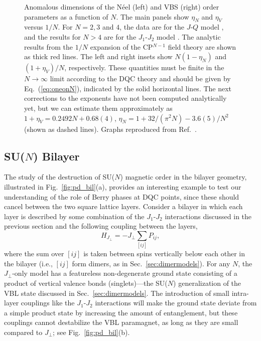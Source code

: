 \documentclass[range]{ar2e}
\begin{document}
\begin{figure}
\centerline{}
 \caption{ \label{fig:exp} Anomalous dimensions of the N\'eel (left) and VBS (right)
  order parameters as a function of $N$. The main panels show $\eta_N$ and $\eta_V$ versus $1/N$. For $N=2,3$ and $4$, the data are 
  for the $J$-$Q$ model \cite{lou2009:sun}, and the results for $N>4$ are for the $J_1$-$J_2$ model \cite{kaul2011:j1j2}. The analytic 
  results from the $1/N$ expansion of the CP$^{N-1}$ field theory are shown as thick red lines. The left and right insets 
  show $N(1-\eta_N)$ and $(1+\eta_V)/N$, respectively. These quantities must be finite in the  $N\rightarrow \infty$ 
  limit according to the DQC theory and should be given by Eq.~(\ref{eq:oneonN}), indicated by the solid horizontal lines. 
  The next corrections to the exponents have not been computed analytically yet, but we can estimate them approximately 
  as $1+\eta_V = 0.2492 N + 0.68(4)$, $\eta_N = 1+32/(\pi^2 N)-3.6(5)/N^2$ (shown as dashed lines). Graphs reproduced 
  from Ref.~\cite{kaul2011:j1j2}.}
\end{figure}

\subsection{SU($N$) Bilayer}
\label{ss:bilN}

The study of the destruction of SU($N$) magnetic order in the bilayer geometry, illustrated in Fig.~\ref{fig:pd_bil}(a), provides an interesting 
example to test our understanding of the role of Berry phases at DQC points, since these should cancel between the two square lattice layers. 
Consider a bilayer in which each layer is described by some combination of the $J_1$-$J_2$ interactions discussed in the previous section and the 
following coupling between the layers,
\begin{equation}
 H_{J_\perp} = -J_\perp \sum_{[ij]} P_{ij},
\end{equation}
where the sum over $[ij]$ is taken between spins vertically below each other in the bilayer (i.e., $[ij]$ form dimers, as in Sec.~\ref{sec:dimermodels}). For 
any $N$, the $J_\perp$-only model has a featureless non-degenerate ground state consisting of a product of vertical valence bonds (singlets)---the SU($N$)
generalization of the VBL state discussed in Sec.~\ref{sec:dimermodels}. The introduction of small intra-layer couplings like the $J_1$-$J_2$ interactions will 
make the ground state deviate from a simple product state by increasing the amount of entanglement, but these couplings cannot destabilize the VBL paramagnet,
as long as they are small compared to $J_\perp$; see Fig.~\ref{fig:pd_bil}(b). 
\end{document}
